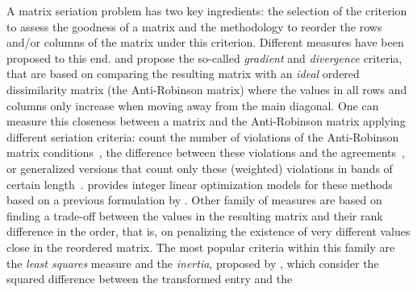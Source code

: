\documentclass[a4paper,11pt, reqno]{amsart}
\begin{document}
A matrix seriation problem has two key ingredients: the selection of the criterion to assess the goodness of a matrix and the methodology to reorder the rows and/or columns of the matrix under this criterion. Different measures have been proposed to this end. \cite{chen2002generalized} and \cite{hubert2001combinatorial} propose the so-called \emph{gradient} and \emph{divergence} criteria, that are based on comparing the resulting matrix with an \emph{ideal} ordered dissimilarity matrix (the Anti-Robinson matrix) where the values in all rows and columns only increase when moving away from the main diagonal. One can measure this closeness between a matrix and the Anti-Robinson matrix applying different seriation criteria: count the number of violations of the Anti-Robinson matrix conditions~\citep{chen2002generalized}, the difference between these violations and the agreements~\citep{hubert2001combinatorial}, or generalized versions that count only these (weighted) violations in bands of certain length~\citep{tien2008methods}. \cite{brusco2002integer} provides integer linear optimization models for these methods based on a previous formulation by \cite{decani1972branch}. Other family of measures are based on finding a trade-off between the values in the resulting matrix and their rank difference in the order, that is, on penalizing the existence of very different values close in the reordered matrix. The most popular criteria within this family are the \emph{least squares} measure and the \emph{inertia}, proposed by \cite{caraux2005permutmatrix}, which consider the squared difference between the transformed entry and the
\end{document}
